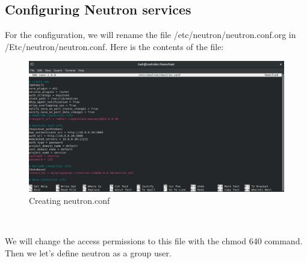 \begin{spacing}{1.2}
\subsection{Configuring Neutron services}
\par For the configuration, we will rename the file /etc/neutron/neutron.conf.org in \newline
/Etc/neutron/neutron.conf. Here is the contents of the file: 
\\
\begin{figure}[!htb] 
\begin{center} 
\includegraphics[width=1\linewidth]{Cloud/Installing and Configuring Neutron services/Creating neutron.conf} 
\end{center} 
\caption{Creating neutron.conf} 
\end{figure} 
\FloatBarrier
\\
\par We will change the access permissions to this file with the chmod 640 command. Then we
let's define neutron as a group user.


\end{spacing}
